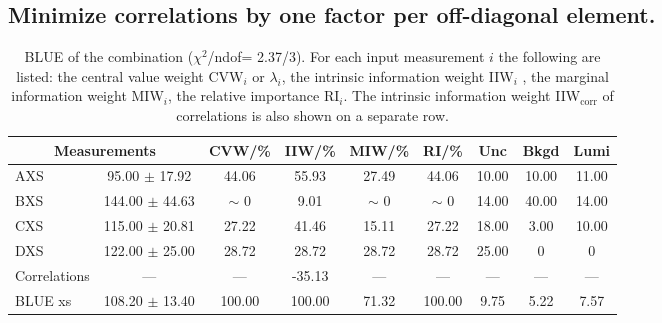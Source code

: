 \subsection{Minimize correlations by one factor per off-diagonal element.}
\begin{table}[H]
\scriptsize
\begin{center}
\renewcommand{\arraystretch}{1.1}
\begin{tabular}{|lc|c|c|c|c|ccc|}
\hline
\multicolumn{2}{|c|}{Measurements} & CVW/\%  & IIW/\%  & MIW/\%  & RI/\%  & {\tiny Unc} & {\tiny Bkgd} & {\tiny Lumi}\\
\hline
AXS &      95.00 $\pm$      17.92 &      44.06 &      55.93 &      27.49 &      44.06 &      10.00 &      10.00 &      11.00\\
BXS &     144.00 $\pm$      44.63 &  {\tiny $\sim$ }0 &       9.01 &  {\tiny $\sim$ }0 &  {\tiny $\sim$ }0 &      14.00 &      40.00 &      14.00\\
CXS &     115.00 $\pm$      20.81 &      27.22 &      41.46 &      15.11 &      27.22 &      18.00 &       3.00 &      10.00\\
DXS &     122.00 $\pm$      25.00 &      28.72 &      28.72 &      28.72 &      28.72 &      25.00 &  0 &  0\\
Correlations & --- & --- &     -35.13 & --- & --- & --- & --- & ---\\
\hline
BLUE {\tiny xs} &     108.20 $\pm$      13.40 &     100.00 &     100.00 &      71.32 &     100.00 &       9.75 &       5.22 &       7.57\\
\hline
\end{tabular}
\caption{BLUE of the combination ($\chi^2$/ndof=      2.37/3).
 For each input measurement $i$ the following are listed: the central value weight CVW$_i$ or $\lambda_i$, the intrinsic information weight IIW$_i$ , the marginal information weight MIW$_i$, the relative importance RI$_i$. The intrinsic information weight IIW$_{\mathrm{corr}}$ of correlations is also shown on a separate row.}
\renewcommand{\arraystretch}{1}
\end{center}
\end{table}
